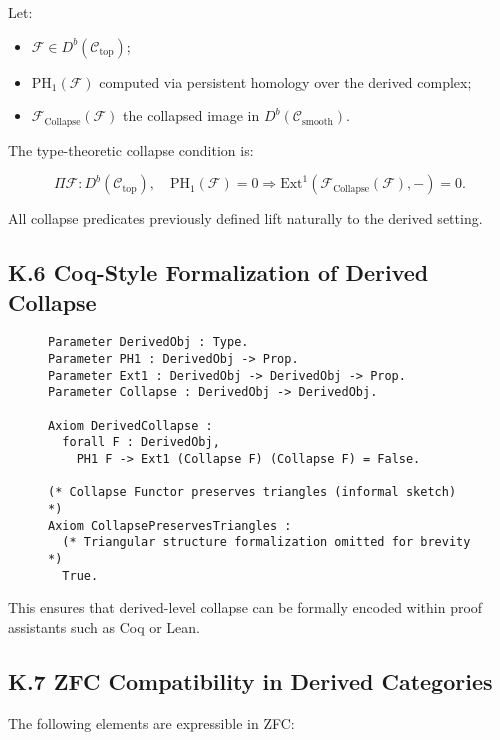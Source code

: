 \documentclass[11pt]{article}
\begin{document}
Let:

\begin{itemize}
    \item \( \mathcal{F} \in D^b(\mathcal{C}_{\mathrm{top}}) \);
    \item \( \mathrm{PH}_1(\mathcal{F}) \) computed via persistent homology over the derived complex;
    \item \( \mathcal{F}_{\mathrm{Collapse}}(\mathcal{F}) \) the collapsed image in \( D^b(\mathcal{C}_{\mathrm{smooth}}) \).
\end{itemize}

The type-theoretic collapse condition is:

\[
\Pi \mathcal{F} : D^b(\mathcal{C}_{\mathrm{top}}), \quad \mathrm{PH}_1(\mathcal{F}) = 0 \Rightarrow \mathrm{Ext}^1(\mathcal{F}_{\mathrm{Collapse}}(\mathcal{F}), -) = 0.
\]

All collapse predicates previously defined lift naturally to the derived setting.

\subsection*{K.6 Coq-Style Formalization of Derived Collapse}

\begin{figure}[h]
\centering
\begin{lstlisting}[language=Coq, mathescape=false]
Parameter DerivedObj : Type.
Parameter PH1 : DerivedObj -> Prop.
Parameter Ext1 : DerivedObj -> DerivedObj -> Prop.
Parameter Collapse : DerivedObj -> DerivedObj.

Axiom DerivedCollapse :
  forall F : DerivedObj,
    PH1 F -> Ext1 (Collapse F) (Collapse F) = False.

(* Collapse Functor preserves triangles (informal sketch) *)
Axiom CollapsePreservesTriangles :
  (* Triangular structure formalization omitted for brevity *)
  True.
\end{lstlisting}
\end{figure}

This ensures that derived-level collapse can be formally encoded within proof assistants such as Coq or Lean.

\subsection*{K.7 ZFC Compatibility in Derived Categories}

The following elements are expressible in ZFC:
\end{document}
